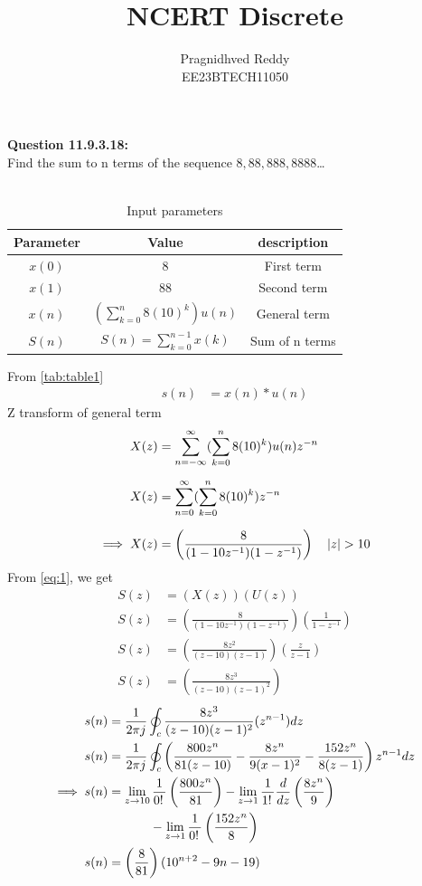 \documentclass[journal,12pt,twocolumn]{IEEEtran}
\title{NCERT Discrete}
\author{Pragnidhved Reddy\\EE23BTECH11050}
\date{}
\begin{document}
\maketitle
\newpage
\bigskip
\textbf{Question 11.9.3.18:}\\
 Find the sum to n terms of the sequence $8,88,888,8888$\ldots\\
 \solution \\
 \begin{table}[H]
\centering
\setlength{\extrarowheight}{8pt}
\begin{tabular}{|c|c|c|}\hline
\textbf{Parameter} & \textbf{Value} & \textbf{description}\\ \hline
$x(0)$ & 8 & First term \\ \hline
$x(1)$ & 88 & Second term \\ \hline 
$x(n)$ & $(\sum^{n}_{k=0}8(10)^k)u(n)$ & General term \\ \hline
$S(n)$ & $S(n)=\sum^{n-1}_{k=0}x(k)$ & Sum of n terms \\ \hline
\end{tabular}
\caption{Input parameters}
\label{tab:table1}
\end{table}
 From \eqref{tab:table1}
\begin{align}
\label{eq:1}
 s(n)&=x(n)* u(n)
 \end{align}
 Z transform of general term
 \begin{align}
 X(z)&=\sum_{n=-\infty}^{\infty}(\sum_{k=0}^{n}8(10)^k)u(n)z^{-n}\\[6pt]
 X(z)&=\sum_{n=0}^{\infty}(\sum_{k=0}^{n}8(10)^k)z^{-n}\\[6pt]
 \implies X(z)&=\left(\frac{8}{(1-10z^{-1})(1-z^{-1})}\right) \quad \left\vert z\right\vert>10
\end{align}
From \eqref{eq:1}, we get
 \begin{align}
 S(z)&=(X(z))(U(z))\\
 S(z)&=\left(\frac{8}{(1-10z^{-1})(1-z^{-1})}\right)\left(\frac{1}{1-z^{-1}}\right)\\[6pt]
  S(z)&=\left(\frac{8z^2}{(z-10)(z-1)}\right)\left(\frac{z}{z-1}\right)\\[6pt]
 S(z)&=\left(\frac{8z^3}{(z-10)(z-1)^2}\right)
 \end{align}
 \begin{align}
 s(n)&=\frac{1}{2\pi j}\oint_{c}\frac{8z^3}{(z-10)(z-1)^2}(z^{n-1})dz\\
s(n)&=\frac{1}{2\pi j} \oint_{c} \left(\frac{800z^{n}}{81(z-10)}-\frac{8z^{n}}{9(x-1)^2}-\frac{152z^{n}}{8(z-1)}\right)z^{n-1}dz\\
\notag \implies s(n)&=\lim_{z\to10}\frac{1}{0\displaystyle !\,}\left(\frac{800z^{n}}{81}\right)-\lim_{z\to1}\frac{1}{1\displaystyle !\,}\frac{d}{dz}\left(\frac{8z^{n}}{9}\right) \\ &~~~~~~~~~~-\lim_{z\to1}\frac{1}{0\displaystyle !\,}\left(\frac{152z^{n}}{8}\right)\\
 s(n)&=\left(\frac{8}{81}\right)(10^{n+2}-9n-19)   
\end{align}
\end{document}
